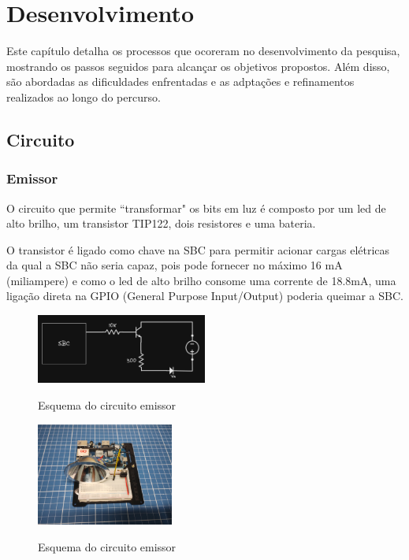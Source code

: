 \section{Desenvolvimento}

Este capítulo detalha os processos que ocoreram no desenvolvimento da pesquisa, mostrando os passos seguidos para alcançar os objetivos propostos. Além disso, são abordadas as dificuldades enfrentadas e as adptações e refinamentos realizados ao longo do percurso.

\subsection{Circuito}

\subsubsection{Emissor}

O circuito que permite ``transformar" os bits em luz é composto por um led de alto brilho, um transistor TIP122, dois resistores e uma bateria.

O transistor é ligado como chave na SBC para permitir acionar cargas elétricas da qual a SBC não seria capaz, pois pode fornecer no máximo 16 mA (miliampere)  e como o led de alto brilho consome uma corrente de 18.8mA, uma ligação direta na GPIO (General Purpose Input/Output) poderia queimar a SBC.

\begin{figure}[!htbp]
  \caption{Esquema do circuito emissor}
  \includegraphics[width=0.5\textwidth]{images/esquema_circuito_emisor.png}
  \label{esquema-circuito-emissor}
\end{figure}

\begin{figure}[!htbp]
  \caption{Esquema do circuito emissor}
  \includegraphics[width=0.4\textwidth]{images/foto_circuito_emisor.jpg}
  \label{foto-circuito-emissor}
\end{figure}

